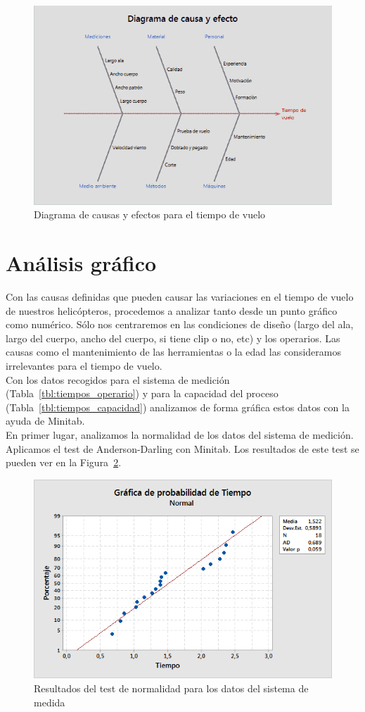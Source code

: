 \documentclass[12pt,a4paper,twoside,openright,titlepage,final]{article}
\begin{document}
\begin{figure}[htbp!]
	\centering
	\includegraphics[width=0.7\linewidth]{imagenes/Diagrama_de_causa_y_efecto}
	\caption{Diagrama de causas y efectos para el tiempo de vuelo}
	\label{fig:causa_efecto}
\end{figure}


\section{Análisis gráfico}

Con las causas definidas que pueden causar las variaciones en el tiempo de vuelo de nuestros helicópteros, procedemos a analizar tanto desde un punto gráfico como numérico. Sólo nos centraremos en las condiciones de diseño (largo del ala, largo del cuerpo, ancho del cuerpo, si tiene clip o no, etc) y los operarios. Las causas como el mantenimiento de las herramientas o la edad las consideramos irrelevantes para el tiempo de vuelo.\\

Con los datos recogidos para el sistema de medición (Tabla~\ref{tbl:tiempos_operario}) y para la capacidad del proceso (Tabla~\ref{tbl:tiempos_capacidad}) analizamos de forma gráfica estos datos con la ayuda de Minitab.\\

En primer lugar, analizamos la normalidad de los datos del sistema de medición. Aplicamos el test de Anderson-Darling con Minitab. Los resultados de este test se pueden ver en la Figura~\ref{fig:normalidad_rr}.\\

\begin{figure}[htbp!]
	\centering
	\includegraphics[width=0.7\linewidth]{imagenes/Grafica_de_normalidad_de_Tiempo_(datos_RR)}
	\caption{Resultados del test de normalidad para los datos del sistema de medida}
	\label{fig:normalidad_rr}
\end{figure}
\end{document}
